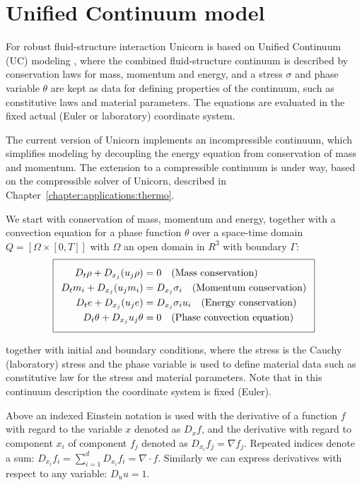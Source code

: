 \section{Unified Continuum model}

For robust fluid-structure interaction Unicorn is based on Unified
Continuum (UC) modeling \cite{HoffmanJanssonEtAl2009}, where the
combined fluid-structure continuum is described by conservation laws
for mass, momentum and energy, and a stress $\sigma$ and phase
variable $\theta$ are kept as data for defining properties of the
continuum, such as constitutive laws and material parameters. The
equations are evaluated in the fixed actual (Euler or laboratory)
coordinate system.

The current version of Unicorn implements an incompressible continuum,
which simplifies modeling by decoupling the energy equation from
conservation of mass and momentum. The extension to a compressible
continuum is under way, based on the compressible solver of Unicorn,
described in Chapter~\ref{chapter:applications:thermo}.

We start with conservation of mass, momentum and energy, together with
a convection equation for a phase function $\theta$ over a space-time
domain $Q = [\Omega \times [0, T]]$ with $\Omega$ an open domain in
$R^3$ with boundary $\Gamma$:
\begin{equation}
  \addtolength{\fboxsep}{5pt}
  \boxed{
    \begin{split}\label{eq:TotalModel}
      D_t \rho + D_{x_j} (u_j \rho) &= 0
      \quad \text{(Mass conservation)}\\
      D_t m_i + D_{x_j} (u_j m_i) &= D_{x_j} \sigma_i
      \quad \text{(Momentum conservation)}\\
      D_t e + D_{x_j} (u_j e) &= D_{x_j} \sigma_i u_i
      \quad \text{(Energy conservation)}\\
      D_t \theta + D_{x_j} u_j \theta &= 0
      \quad \text{(Phase convection equation)}
    \end{split}
  }
\end{equation}

together with initial and boundary conditions, where the stress is the
Cauchy (laboratory) stress and the phase variable is used to define
material data such as constitutive law for the stress and material
parameters. Note that in this continuum description the coordinate
system is fixed (Euler).

Above an indexed Einstein notation is used with the derivative of a
function $f$ with regard to the variable $x$ denoted as $D_x f$, and
the derivative with regard to component $x_i$ of component $f_j$
denoted as $D_{x_i} f_j = \nabla f_j$. Repeated indices denote a sum:
$D_{x_i} f_i = \sum_{i=1}^d D_{x_i} f_i = \nabla \cdot f$. Similarly
we can express derivatives with respect to any variable: $D_u u = 1$.


